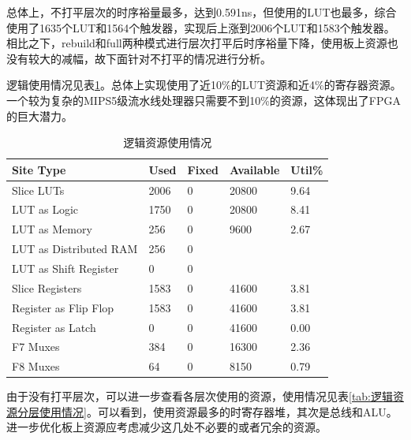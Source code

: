\documentclass[a4paper]{article}
\begin{document}
总体上，不打平层次的时序裕量最多，达到0.591ns，但使用的LUT也最多，综合使用了1635个LUT和1564个触发器，实现后上涨到2006个LUT和1583个触发器。相比之下，rebuild和full两种模式进行层次打平后时序裕量下降，使用板上资源也没有较大的减幅，故下面针对不打平的情况进行分析。

逻辑使用情况见表\ref{tab:slice logic}。总体上实现使用了近10\%的LUT资源和近4\%的寄存器资源。一个较为复杂的MIPS5级流水线处理器只需要不到10\%的资源，这体现出了FPGA的巨大潜力。

\begin{table}[htb]
    \centering
    \caption{逻辑资源使用情况}
    \label{tab:slice logic}
    \begin{tabular}{lllll}
        \toprule
        Site Type                     & Used & Fixed & Available & Util\% \\
        \midrule
        Slice LUTs                    & 2006 & 0     & 20800     & 9.64   \\
        \quad LUT as Logic            & 1750 & 0     & 20800     & 8.41   \\
        \quad LUT as Memory           & 256  & 0     & 9600      & 2.67   \\
        \qquad LUT as Distributed RAM & 256  & 0     &           &        \\
        \qquad LUT as Shift Register  & 0    & 0     &           &        \\
        Slice Registers               & 1583 & 0     & 41600     & 3.81   \\
        \quad Register as Flip Flop   & 1583 & 0     & 41600     & 3.81   \\
        \quad Register as Latch       & 0    & 0     & 41600     & 0.00   \\
        F7 Muxes                      & 384  & 0     & 16300     & 2.36   \\
        F8 Muxes                      & 64   & 0     & 8150      & 0.79   \\
        \bottomrule\end{tabular}
\end{table}

由于没有打平层次，可以进一步查看各层次使用的资源，使用情况见表\ref{tab:逻辑资源分层使用情况}。可以看到，使用资源最多的时寄存器堆，其次是总线和ALU。进一步优化板上资源应考虑减少这几处不必要的或者冗余的资源。
\end{document}
